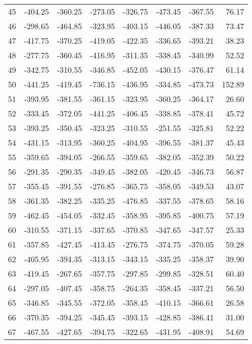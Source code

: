 \begin{longtable}{rrrrrrrr}
45 & -404.25 & -360.25 & -273.05 & -326.75 & -473.45 & -367.55 & 76.17  \\
46 & -298.65 & -464.85 & -323.95 & -403.15 & -446.05 & -387.33 & 73.47  \\
47 & -417.75 & -370.25 & -419.05 & -422.35 & -336.65 & -393.21 & 38.23  \\
48 & -277.75 & -360.45 & -416.95 & -311.35 & -338.45 & -340.99 & 52.52  \\
49 & -342.75 & -310.55 & -346.85 & -452.05 & -430.15 & -376.47 & 61.14  \\
50 & -441.25 & -419.45 & -736.15 & -436.95 & -334.85 & -473.73 & 152.89  \\
51 & -393.95 & -381.55 & -361.15 & -323.95 & -360.25 & -364.17 & 26.60  \\
52 & -333.45 & -372.05 & -441.25 & -406.45 & -338.85 & -378.41 & 45.72  \\
53 & -393.25 & -350.45 & -323.25 & -310.55 & -251.55 & -325.81 & 52.22  \\
54 & -431.15 & -313.95 & -360.25 & -404.95 & -396.55 & -381.37 & 45.43  \\
55 & -359.65 & -394.05 & -266.55 & -359.65 & -382.05 & -352.39 & 50.22  \\
56 & -291.35 & -290.35 & -349.45 & -382.05 & -420.45 & -346.73 & 56.87  \\
57 & -355.45 & -391.55 & -276.85 & -365.75 & -358.05 & -349.53 & 43.07  \\
58 & -361.35 & -382.25 & -335.25 & -476.85 & -337.55 & -378.65 & 58.16  \\
59 & -462.45 & -454.05 & -332.45 & -358.95 & -395.85 & -400.75 & 57.19  \\
60 & -310.55 & -371.15 & -337.65 & -370.85 & -347.65 & -347.57 & 25.33  \\
61 & -357.85 & -427.45 & -413.45 & -276.75 & -374.75 & -370.05 & 59.28  \\
62 & -405.95 & -394.35 & -313.15 & -343.15 & -335.25 & -358.37 & 39.90  \\
63 & -419.45 & -267.65 & -357.75 & -297.85 & -299.85 & -328.51 & 60.40  \\
64 & -297.05 & -407.45 & -358.75 & -264.35 & -358.45 & -337.21 & 56.50  \\
65 & -346.85 & -345.55 & -372.05 & -358.45 & -410.15 & -366.61 & 26.58  \\
66 & -370.35 & -394.25 & -345.45 & -393.15 & -428.85 & -386.41 & 31.00  \\
67 & -467.55 & -427.65 & -394.75 & -322.65 & -431.95 & -408.91 & 54.69  \\

\end{longtable}
